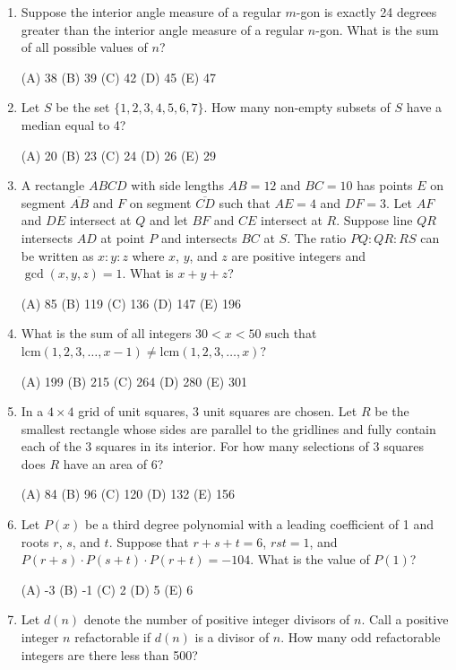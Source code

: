 \documentclass[12pt]{scrartcl}
\begin{document}
\begin{enumerate}
\quad (A) 4 \quad (B) 11 \quad (C) 13 \quad (D) 23 \quad (E) 179

\item Suppose the interior angle measure of a regular $m$-gon is exactly 24 degrees greater than the interior angle measure of a regular $n$-gon. What is the sum of all possible values of $n$?

\quad (A) 38 \quad (B) 39 \quad (C) 42 \quad (D) 45 \quad (E) 47

\item Let $S$ be the set $\{1,2,3,4,5,6,7\}$. How many non-empty subsets of $S$ have a median equal to 4?

\quad (A) 20 \quad (B) 23 \quad (C) 24 \quad (D) 26 \quad (E) 29

\item A rectangle $ABCD$ with side lengths $AB=12$ and $BC=10$ has points $E$ on segment $\overline{AB}$ and $F$ on segment $\overline{CD}$ such that $AE=4$ and $DF=3$. Let $AF$ and $DE$ intersect at $Q$ and let $BF$ and $CE$ intersect at $R$. Suppose line $QR$ intersects $AD$ at point $P$ and intersects $BC$ at $S$. The ratio $PQ:QR:RS$ can be written as $x:y:z$ where $x$, $y$, and $z$ are positive integers and $\gcd(x,y,z)=1$. What is $x+y+z$?

\quad (A) 85 \quad (B) 119 \quad (C) 136 \quad (D) 147 \quad (E) 196

\item What is the sum of all integers $30<x<50$ such that $\text{lcm}(1,2,3,\dots,x-1)\ne \text{lcm}(1,2,3,\dots,x)?$

\quad (A) 199 \quad (B) 215 \quad (C) 264 \quad (D) 280 \quad (E) 301

\item In a $4\times4$ grid of unit squares, 3 unit squares are chosen. Let $R$ be the smallest rectangle whose sides are parallel to the gridlines and fully contain each of the 3 squares in its interior. For how many selections of 3 squares does $R$ have an area of 6?

\quad (A) 84 \quad (B) 96 \quad (C) 120 \quad (D) 132 \quad (E) 156

\item Let $P(x)$ be a third degree polynomial with a leading coefficient of 1 and roots $r$, $s$, and $t$. Suppose that $r+s+t=6$, $rst=1$, and $P(r+s)\cdot P(s+t)\cdot P(r+t)=-104$. What is the value of $P(1)$?

\quad (A) -3 \quad (B) -1 \quad (C) 2 \quad (D) 5 \quad (E) 6

\item Let $d(n)$ denote the number of positive integer divisors of $n$. Call a positive integer $n$ refactorable if $d(n)$ is a divisor of $n$. How many odd refactorable integers are there less than 500?


\end{enumerate}
\end{document}
